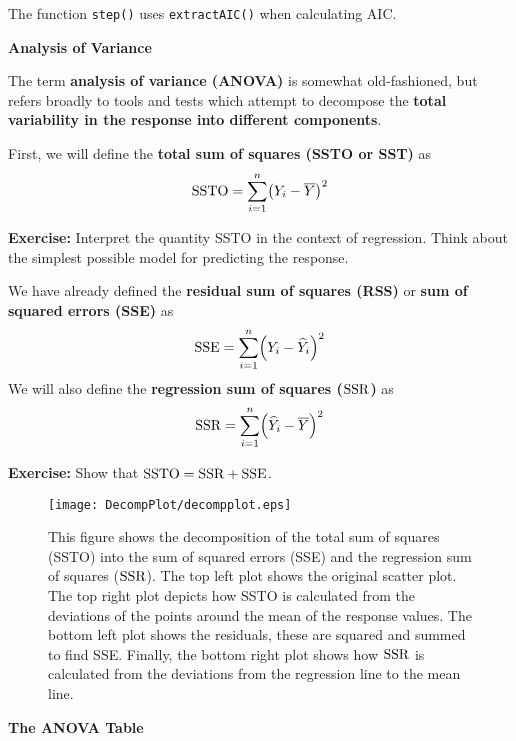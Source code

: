 \documentclass{report}
\begin{document}
\vspace{-.2in}
The function {\tt step()} uses {\tt extractAIC()} when calculating AIC.


\newpage
\makerule
{\bf \LARGE Analysis of Variance}

The term {\bf analysis of variance (ANOVA)} is somewhat
old-fashioned, but refers broadly to tools and tests
which attempt to decompose the {\bf total
variability in the response into different components}.

First, we will define the {\bf total sum of squares (SSTO or SST)}
as
\[
   {\rm SSTO} = \sum_{i=1}^n \!\left(Y_i - \overline{Y}\right)^2
\]

\textcolor{qcol}{{\bf Exercise:} Interpret the quantity SSTO in the
context of regression. Think about the simplest possible model
for predicting the response.}


\newpage
We have already defined the {\bf residual sum of squares (RSS)} or 
{\bf sum of squared errors (SSE)} as
\[
   {\rm SSE} = \sum_{i=1}^n \!\left(Y_i - \widehat Y_i\right)^2
\]
We will also define the {\bf regression sum of squares (${\rm SSR}$)} as
\[
   {\rm SSR} = \sum_{i=1}^n \!\left(\widehat Y_i - \overline{Y}\right)^2
\]

\textcolor{qcol}{{\bf Exercise:} Show that ${\rm SSTO} = {\rm SSR} + {\rm SSE}$.}


\newpage

\vspace{-.3in}
\begin{figure}[ht]
\begin{center}
\texttt{[image: DecompPlot/decompplot.eps]}
\caption{This figure shows the decomposition of the total sum of squares (SSTO)
into the sum of squared errors (SSE) and the regression sum of squares (${\rm SSR}$).
The top left plot shows the original scatter plot. The top right plot depicts
how SSTO is calculated from the deviations of the points around the mean of the
response values. The bottom left plot shows the residuals, these are squared
and summed to find SSE. Finally, the bottom right plot shows how ${\rm SSR}$
is calculated
from the deviations from the regression line to the mean line.}
\label{decompplot}
\end{center}
\end{figure}


\newpage
\makerule

{\bf The ANOVA Table}
\end{document}

